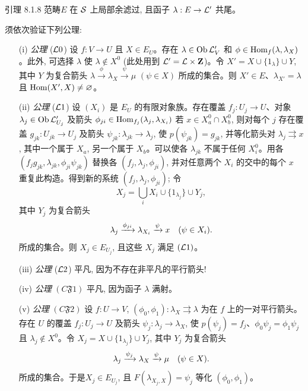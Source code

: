 \begin{enonce*}{引理 8.1.8}
范畴\pageoriginale $E$ 在 ${\mathcal S}$ 上局部余滤过, 且函子 $\lambda:E\to\Ll'$ 共尾。
\end{enonce*}

须依次验证下列公理:
\begin{itemize}
\item[(i) \emph{公理} ($\Ll0$)] 设 $f:V\to U$ 且 $X\in E_U$。存在 $\lambda\in\operatorname{Ob}{\mathcal L}'_V$ 和 $\phi\in\operatorname{Hom}_f(\lambda,\lambda_X)$。此外, 可选择 $\lambda$ 使 $\lambda\notin X^0$ (此处用到 ${\mathcal L}'={\mathcal L}\times\mathbf{Z}$)。令 $X'=X\cup\{1_\lambda\}\cup Y$, 其中 $Y$ 为复合箭头
$\lambda\xrightarrow{\phi}\lambda_X\xrightarrow{\psi}\mu$
$(\psi\in X)$ 所成的集合。则 $X'\in E$、$\lambda_{X'}=\lambda$ 且 $\operatorname{Hom}(X',X)\neq\varnothing$。

\item[(ii) \emph{公理} ($\Ll1$)] 设 $(X_i)$ 是 $E_U$ 的有限对象族。存在覆盖 $f_j:U_j\to U$、对象 $\lambda_j\in\operatorname{Ob}{\mathcal L}'_{U_j}$ 及箭头
$\phi_{ji}\in\operatorname{Hom}_{f_j}(\lambda_j,\lambda_{X_i})$
若 $x\in X_a^0\cap X_b^0$, 则对每个 $j$ 存在覆盖 $g_{jk}:U_{jk}\to U_j$ 及箭头 $\psi_{jk}:\lambda_{jk}\to\lambda_j$, 使 $p(\psi_{jk})=g_{jk}$, 并等化箭头对 $\lambda_j\rightrightarrows x$, 其中一个属于 $X_a$, 另一个属于 $X_b$。可以使各 $\lambda_{jk}$ 不属于任何 $X_i^0$。用各 $(f_jg_{jk},\lambda_{jk},\phi_{ji}\psi_{jk})$ 替换各 $(f_j,\lambda_j,\phi_{ji})$, 并对任意两个 $X_i$ 的交中的每个 $x$ 重复此构造。得到新的系统 $(f_j,\lambda_j,\phi_{ji})$; 令
$$
X_j=\bigcup_iX_i\cup\{1_{\lambda_j}\}\cup Y_j,
$$
其中 $Y_j$ 为复合箭头
$$
\lambda_j\xrightarrow{\phi_{ji}}\lambda_{X_i}
\xrightarrow{\psi}x\quad(\psi\in X_i){}.
$$
所成的集合。则 $X_j\in E_{U_j}$, 且这些 $X_j$ 满足 $({\mathcal L}1)$。

\item[(iii) \emph{公理} ($\Ll2$)] 平凡, 因为不存在非平凡的平行箭头!

\item[(iv) \emph{公理} $(C\mathfrak{F}1)$] 平凡, 因为函子 $\lambda$ 满射。

\item[(v) \emph{公理} $(C\mathfrak{F}2)$] 设 $f:U\to V$, $(\phi_0,\phi_1):\lambda_X\rightrightarrows\lambda$ 为在 $f$ 上的一对平行箭头。存在 $U$ 的覆盖 $f_j:U_j\to U$ 及箭头 $\psi_j:\lambda_j\to\lambda_X$, 使 $p(\psi_j)=f_j$、$\phi_0\psi_j=\phi_1\psi_j$ 且 $\lambda_j\notin X^0$。令 $X_j=X\cup\{1_{\lambda_j}\}\cup Y_j$, 其中 $Y_j$ 为复合箭头
$$
\lambda_j\xrightarrow[]{\psi_j}\lambda_X\xrightarrow{\psi}\mu
\quad(\psi\in X){}.
$$
所成的集合。于是\pageoriginale $X_j\in E_{U_j}$, 且 $F(\lambda_{X_j,X})=\psi_j$ 等化 $(\phi_0,\phi_1)$。
\end{itemize}

